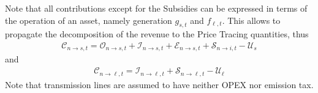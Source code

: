 \documentclass[11pt,twocolumn]{article}
\newcommand{\ie}{\textit{i.e.} }
\newcommand{\ra}{\rightarrow}
\newcommand{\generation}{g_{s,t}}
\newcommand{\flow}{f_{\ell,t}}
\newcommand{\totalcost}{\mathcal{T}}
\newcommand{\cost}{\mathcal{C}}
\newcommand{\allocategeneratorcost}[1][n \rightarrow s]{\cost_{#1, t}}
\newcommand{\allocatelinecost}[1][n \rightarrow \ell]{\cost_{#1, t}}
\newcommand{\opex}{\mathcal{O}}
\newcommand{\opexgeneration}{\mathcal{O}^G}
\newcommand{\capex}{\mathcal{I}}
\newcommand{\capexflow}{\mathcal{I}^F}
\newcommand{\emissioncost}{\mathcal{E}}
\newcommand{\scarcitycost}{\mathcal{S}}
\newcommand{\subsidycost}{\mathcal{U}}
\newcommand{\allocatecapex}[1][n \rightarrow s,t]{\mathcal{I}_{#1}}
\newcommand{\allocateopex}[1][n \rightarrow s]{\opex_{#1,t}}
\newcommand{\allocateemissioncost}[1][n \rightarrow s]{\emissioncost_{#1,t}}
\newcommand{\allocatescarcitycost}[1][n \rightarrow i]{\scarcitycost_{#1,t}}
\begin{document}
Note that all contributions except for the Subsidies can be expressed in terms of the operation of an asset, namely generation $\generation$ and $\flow$. This allows to propagate the decomposition of the revenue to the Price Tracing quantities, thus 
\begin{align}
    \allocategeneratorcost = \allocateopex + \allocatecapex + \allocateemissioncost + \allocatescarcitycost - \subsidycost_s
\end{align} 
and 
\begin{align}
    \allocatelinecost = \capex_{n \ra \ell, t} + \scarcitycost_{n \ra \ell, t} - \subsidycost_\ell
\end{align}
Note that transmission lines are assumed to have neither \ac{OPEX} nor emission tax.




 \clearpage
 

    
\end{document}
